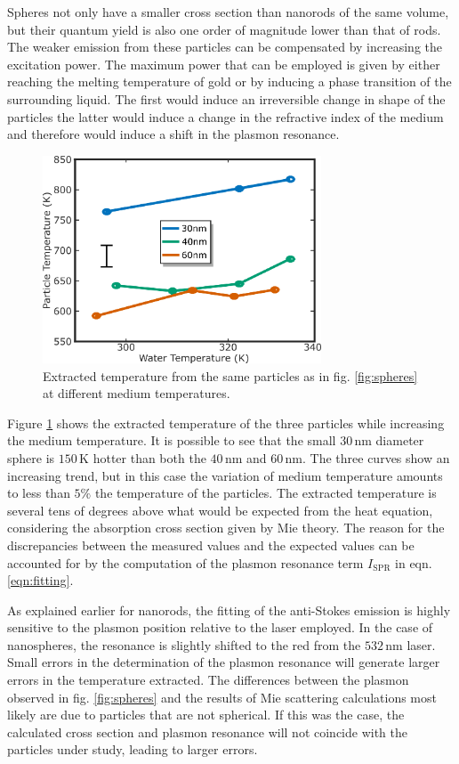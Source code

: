 \documentclass[journal=nalefd,manuscript=letter]{achemso}
\newcommand{\K}{\ensuremath{\,\textrm{K}}}
\newcommand{\nm}{\ensuremath{\,\textrm{nm}}}
\begin{document}
 Spheres not only have a smaller cross section than nanorods of the same volume,
 but their quantum yield is also one order of magnitude lower than that of
 rods\cite{Yorulmaz2012}. The weaker emission from these particles can be
 compensated by increasing the excitation power. The maximum power that can be
 employed is given by either reaching the melting temperature of gold or by
 inducing a phase transition of the surrounding liquid. The first would induce an
 irreversible change in shape of the particles\cite{Zijlstra2009a} the latter
 would induce a change in the refractive index of the medium and therefore would
 induce a shift in the plasmon resonance\cite{Hou2015}.
 
 \begin{figure}[tp] \centering
 \includegraphics[width=82.7mm]{Figures/07_Spheres/07_spheres_02.png}
 \caption{Extracted temperature from the same particles as in fig.
 \ref{fig:spheres} at different medium temperatures. }
 	\label{fig:spheres_temp}
 \end{figure}
 
 Figure \ref{fig:spheres_temp} shows the extracted temperature of the three
 particles while increasing the medium temperature. It is possible to see that
 the small $30\nm$ diameter sphere is $150\K$ hotter than both the $40\nm$ and
 $60\nm$. The three curves show an increasing trend, but in this case the
 variation of medium temperature amounts to less than $5\%$ the temperature of
 the particles. The extracted temperature is several tens of degrees above what
 would be expected from the heat equation, considering the absorption cross
 section given by Mie theory. The reason for the discrepancies between the
 measured values and the expected values can be accounted for by the computation
 of the plasmon resonance term $I_\textrm{SPR}$ in eqn. \ref{eqn:fitting}.
 
 As explained earlier for nanorods, the fitting of the anti-Stokes emission is
 highly sensitive to the plasmon position relative to the laser employed. In the
 case of nanospheres, the resonance is slightly shifted to the red from the
 $532\nm$ laser. Small errors in the determination of the plasmon resonance will
 generate larger errors in the temperature extracted. The differences between the
 plasmon observed in fig. \ref{fig:spheres} and the results of Mie scattering
 calculations most likely are due to particles that are not spherical. If this
 was the case, the calculated cross section and plasmon resonance will not
 coincide with the particles under study, leading to larger errors.
 
\end{document}
